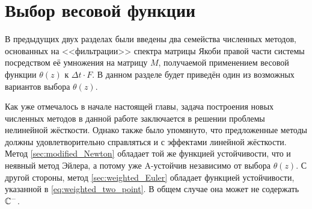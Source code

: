 \section{Выбор весовой функции}
\label{sec:choosing_weight}

В предыдущих двух разделах были введены два семейства численных методов,
основанных на <<фильтрации>> спектра матрицы Якоби правой части системы
посредством её умножения на матрицу $ M $,
получаемой применением весовой функции $ \theta(z) $ к $ \Delta t \cdot F $.
В данном разделе будет приведён один из возможных вариантов выбора $ \theta(z) $.

Как уже отмечалось в начале настоящей главы,
задача построения новых численных методов в данной работе заключается в решении проблемы нелинейной жёсткости.
Однако также было упомянуто, что предложенные методы должны удовлетворительно справляться и с эффектами линейной жёсткости.
Метод \ref{sec:modified_Newton} обладает той же функцией устойчивости, что и неявный метод Эйлера,
а потому уже A-устойчив независимо от выбора $ \theta(z) $.
С другой стороны, метод \ref{sec:weighted_Euler} обладает функцией устойчивости,
указанной в \eqref{eq:weighted_two_point}.
В общем случае она может не содержать $ \mathbb{C}^- $.


